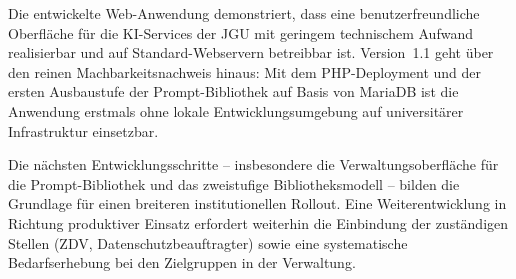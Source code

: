 \documentclass[12pt, a4paper]{article}
\begin{document}
Die entwickelte Web-Anwendung demonstriert, dass eine benutzerfreundliche Oberfläche für die KI-Services der JGU mit geringem technischem Aufwand realisierbar und auf Standard-Webservern betreibbar ist. Version~1.1 geht über den reinen Machbarkeitsnachweis hinaus: Mit dem PHP-Deployment und der ersten Ausbaustufe der Prompt-Bibliothek auf Basis von MariaDB ist die Anwendung erstmals ohne lokale Entwicklungsumgebung auf universitärer Infrastruktur einsetzbar.

Die nächsten Entwicklungsschritte -- insbesondere die Verwaltungsoberfläche für die Prompt-Bibliothek und das zweistufige Bibliotheksmodell -- bilden die Grundlage für einen breiteren institutionellen Rollout. Eine Weiterentwicklung in Richtung produktiver Einsatz erfordert weiterhin die Einbindung der zuständigen Stellen (ZDV, Datenschutzbeauftragter) sowie eine systematische Bedarfserhebung bei den Zielgruppen in der Verwaltung.

\newpage
\printbibliography[title={Literatur}]
\end{document}
